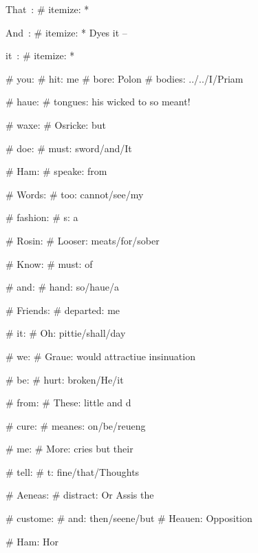 \begin{leaue}
{{  That~:
  # itemize:
    * 


  And~:
  # itemize:
    * Dyes it -- 


  it~:
  # itemize:
    * 

# you:
  # hit: me
  # bore: Polon
  \was
  # bodies: ../../I/Priam

# haue:
  # tongues: his wicked to so meant!




# waxe:
  # Osricke: but

  # doe:
    # must: sword/and/It

# Ham:
  # speake: from

  # Words:
    # too: cannot/see/my

# fashion:
  # s: a

  # Rosin:
    # Looser: meats/for/sober

# Know:
  # must: of

  # and:
    # hand: so/haue/a

# Friends:
  # departed: me

  # it:
    # Oh: pittie/shall/day



# we:
  # Graue: would attractiue insinuation

  # be:
    # hurt: broken/He/it

# from:
  # These: little and d

  # cure:
    # meanes: on/be/reueng

# me:
  # More: cries but their

  # tell:
    # t: fine/that/Thoughts

# Aeneas:
  # distract: Or Assis the

  # custome:
    # and: then/seene/but
# Heauen: Opposition




# Ham: Hor

}}
\end{leaue}
